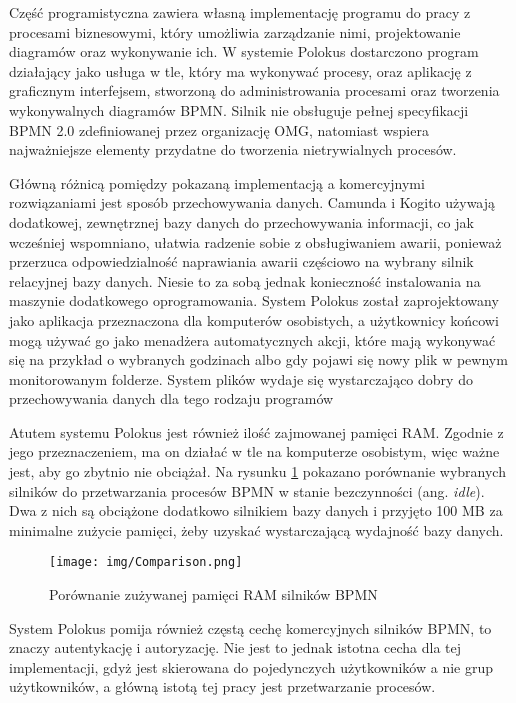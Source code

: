 \documentclass[declaration,shortabstract,mgr]{iithesis}
\newcommand{\bpmn}{BPMN }
\newcommand{\bpmnnospace}{BPMN}
\begin{document}
Część programistyczna zawiera własną implementację programu do pracy z procesami biznesowymi, który umożliwia zarządzanie nimi, projektowanie diagramów oraz wykonywanie ich. W systemie Polokus dostarczono program działający jako usługa w tle, który ma wykonywać procesy, oraz aplikację z graficznym interfejsem, stworzoną do administrowania procesami oraz tworzenia wykonywalnych diagramów \bpmnnospace. Silnik nie obsługuje pełnej specyfikacji \bpmn 2.0 zdefiniowanej przez organizację OMG, natomiast wspiera najważniejsze elementy przydatne do tworzenia nietrywialnych procesów.

Główną różnicą pomiędzy pokazaną implementacją a komercyjnymi rozwiązaniami jest sposób przechowywania danych. Camunda i Kogito używają dodatkowej, zewnętrznej bazy danych do przechowywania informacji, co jak wcześniej wspomniano, ułatwia radzenie sobie z obsługiwaniem awarii, ponieważ przerzuca odpowiedzialność naprawiania awarii częściowo na wybrany silnik relacyjnej bazy danych. Niesie to za sobą jednak konieczność instalowania na maszynie dodatkowego oprogramowania. System Polokus został zaprojektowany jako aplikacja przeznaczona dla komputerów osobistych, a użytkownicy końcowi mogą używać go jako menadżera automatycznych akcji, które mają wykonywać się na przykład o wybranych godzinach albo gdy pojawi się nowy plik w pewnym monitorowanym folderze. System plików wydaje się wystarczająco dobry do przechowywania danych dla tego rodzaju programów

Atutem systemu Polokus jest również ilość zajmowanej pamięci RAM. Zgodnie z jego przeznaczeniem, ma on działać w tle na komputerze osobistym, więc ważne jest, aby go zbytnio nie obciążał. Na rysunku \ref{fig:comparison} pokazano porównanie wybranych silników do przetwarzania procesów \bpmn w stanie bezczynności (ang. \textit{idle}). Dwa z nich są obciążone dodatkowo silnikiem bazy danych i przyjęto 100 MB za minimalne zużycie pamięci, żeby uzyskać wystarczającą wydajność bazy danych.

\begin{figure}[H]
    \texttt{[image: img/Comparison.png]}
    \caption{Porównanie zużywanej pamięci RAM silników BPMN}
    \label{fig:comparison}
\end{figure}

System Polokus pomija również częstą cechę komercyjnych silników \bpmnnospace, to znaczy autentykację i autoryzację. Nie jest to jednak istotna cecha dla tej implementacji, gdyż  jest skierowana do pojedynczych użytkowników a nie grup użytkowników, a główną istotą tej pracy jest przetwarzanie procesów.
\end{document}
